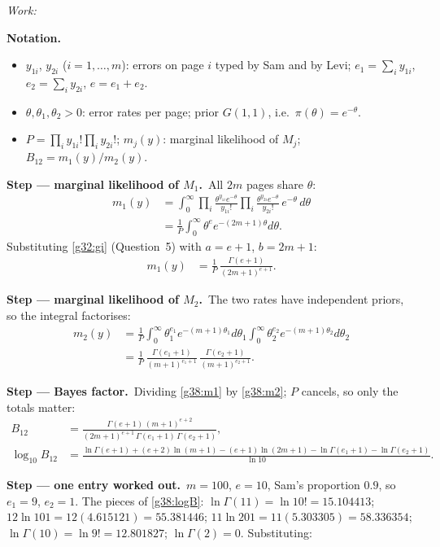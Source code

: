 \documentclass[11pt,a4paper]{article}
\newif\ifsolucoes
\newcommand{\espacoresol}{4.5cm}   %
\newenvironment{notacao}{\par\smallskip\noindent\textbf{Notation.}\begin{itemize}[leftmargin=1.4em,topsep=1pt,itemsep=0pt]\small}{\end{itemize}}
\newcommand{\resolespaco}{\ifsolucoes\else\par\textit{Work:}\vspace{\espacoresol}\par\fi}
\newcommand{\passo}[2]{\par\smallskip\noindent\textbf{Step --- #1.}~#2}
\begin{document}
\resolespaco
\begin{sol}
\begin{notacao}
\item $y_{1i}$, $y_{2i}$ ($i=1,\ldots,m$): errors on page $i$ typed by Sam and by Levi; $e_1=\sum_iy_{1i}$, $e_2=\sum_iy_{2i}$, $e=e_1+e_2$.
\item $\theta,\theta_1,\theta_2>0$: error rates per page; prior $G(1,1)$, i.e.\ $\pi(\theta)=e^{-\theta}$.
\item $P=\prod_iy_{1i}!\prod_iy_{2i}!$; $m_j(y)$: marginal likelihood of $M_j$; $B_{12}=m_1(y)/m_2(y)$.
\end{notacao}
\passo{marginal likelihood of $M_1$}{All $2m$ pages share $\theta$:
\begin{align}
m_1(y)&=\int_0^\infty\prod_{i}\frac{\theta^{y_{1i}}e^{-\theta}}{y_{1i}!}\prod_{i}\frac{\theta^{y_{2i}}e^{-\theta}}{y_{2i}!}\,e^{-\theta}\,d\theta\label{g38:m1a}\\
&=\frac1P\int_0^\infty\theta^{e}e^{-(2m+1)\theta}d\theta.\label{g38:m1b}
\end{align}
Substituting \eqref{g32:gi} (Question~5) with $a=e+1$, $b=2m+1$:
\begin{align}
m_1(y)&=\frac1P\,\frac{\Gamma(e+1)}{(2m+1)^{e+1}}.\label{g38:m1}
\end{align}}
\passo{marginal likelihood of $M_2$}{The two rates have independent priors, so the integral factorises:
\begin{align}
m_2(y)&=\frac1P\int_0^\infty\theta_1^{e_1}e^{-(m+1)\theta_1}d\theta_1\int_0^\infty\theta_2^{e_2}e^{-(m+1)\theta_2}d\theta_2\label{g38:m2a}\\
&=\frac1P\,\frac{\Gamma(e_1+1)}{(m+1)^{e_1+1}}\,\frac{\Gamma(e_2+1)}{(m+1)^{e_2+1}}.\label{g38:m2}
\end{align}}
\passo{Bayes factor}{Dividing \eqref{g38:m1} by \eqref{g38:m2}; $P$ cancels, so only the totals matter:
\begin{align}
B_{12}&=\frac{\Gamma(e+1)\,(m+1)^{e+2}}{(2m+1)^{e+1}\,\Gamma(e_1+1)\,\Gamma(e_2+1)},\label{g38:B}\\
\log_{10}B_{12}&=\frac{\ln\Gamma(e+1)+(e+2)\ln(m+1)-(e+1)\ln(2m+1)-\ln\Gamma(e_1+1)-\ln\Gamma(e_2+1)}{\ln10}.\label{g38:logB}
\end{align}}
\passo{one entry worked out}{$m=100$, $e=10$, Sam's proportion $0.9$, so $e_1=9$, $e_2=1$. The pieces of \eqref{g38:logB}: $\ln\Gamma(11)=\ln10!=15.104413$; $12\ln101=12(4.615121)=55.381446$; $11\ln201=11(5.303305)=58.336354$; $\ln\Gamma(10)=\ln9!=12.801827$; $\ln\Gamma(2)=0$. Substituting:
\begin{align}

\end{align}}
\end{sol}
\end{document}
